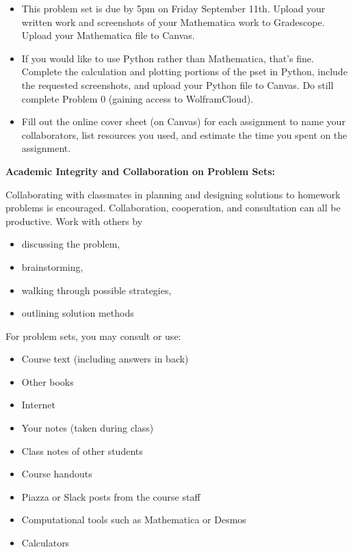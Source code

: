 \documentclass[12pt,letterpaper,noanswers]{exam}
\begin{document}
 \pdfpageheight 11in 
  \pdfpagewidth 8.5in
\begin{itemize}
\item This problem set is due by 5pm on Friday September 11th.  Upload your written work and screenshots of your Mathematica work to Gradescope.  Upload your Mathematica file to Canvas.
\item If you would like to use Python rather than Mathematica, that's fine.  Complete the calculation and plotting portions of the pset in Python, include the requested screenshots, and upload your Python file to Canvas.  Do still complete Problem 0 (gaining access to WolframCloud).
\item Fill out the online cover sheet (on Canvas) for each assignment to name your collaborators, list resources you used, and estimate the time you spent on the assignment.
\end{itemize}

\noindent\textbf{Academic Integrity and Collaboration on Problem Sets:}  

Collaborating with classmates in planning and designing solutions to homework problems is encouraged.  Collaboration, cooperation, and consultation can all be productive.  Work with others by 
\begin{multicols}{2}
\begin{itemize}
\itemsep-0.2em
    \item discussing the problem,
    \item brainstorming,
    \item walking through possible strategies,
    \item outlining solution methods
\end{itemize}   
\end{multicols}

\noindent For problem sets, you may consult or use:
\begin{multicols}{2}
\begin{itemize}
\itemsep-0.2em
    \item Course text (including answers in back)
    \item Other books
    \item Internet
    \item Your notes (taken during class)
    \item Class notes of other students
    \item Course handouts
    \item Piazza or Slack posts from the course staff
    \item Computational tools such as Mathematica or Desmos
    \item Calculators
\end{itemize}
\end{multicols}
\end{document}
